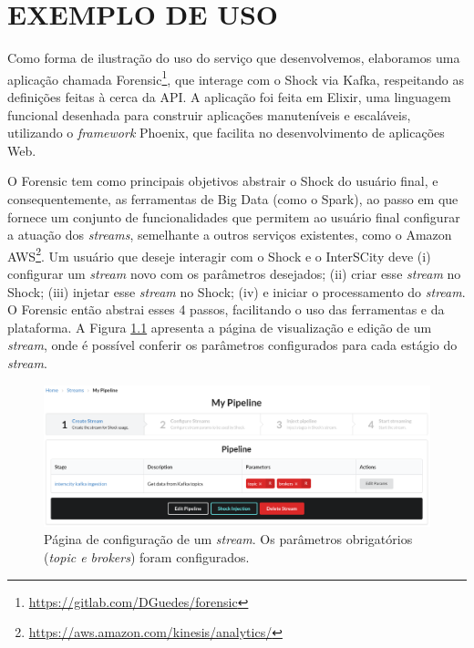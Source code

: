 \chapter[EXEMPLO DE USO]{EXEMPLO DE USO}
\label{chapter:example}

Como forma de ilustração do uso do serviço que desenvolvemos, elaboramos uma
aplicação chamada
Forensic\footnote{\url{https://gitlab.com/DGuedes/forensic}}, que interage
com o Shock via Kafka,
respeitando as definições feitas à cerca da API. A aplicação foi feita em
Elixir, uma linguagem funcional desenhada para construir aplicações
manuteníveis e escaláveis, utilizando o \textit{framework} Phoenix, que
facilita no desenvolvimento de aplicações Web.

O Forensic tem como principais objetivos abstrair o Shock do usuário final,
e consequentemente, as ferramentas de Big Data (como o Spark), ao passo em que
fornece um conjunto de funcionalidades que permitem ao usuário final configurar
a atuação dos \textit{streams}, semelhante a outros serviços existentes,
como o Amazon AWS\footnote{\url{https://aws.amazon.com/kinesis/analytics/}}.
Um usuário que deseje interagir com o Shock e o InterSCity deve
(i) configurar um \textit{stream} novo com os
parâmetros desejados; (ii) criar esse \textit{stream} no Shock; (iii) injetar
esse \textit{stream} no Shock; (iv) e iniciar o processamento do
\textit{stream}. O Forensic então abstrai esses 4 passos, facilitando o uso
das ferramentas e da plataforma. A Figura \ref{fig:forensicparams} apresenta
a página de visualização e edição de um \textit{stream}, onde é possível
conferir os parâmetros configurados para cada estágio do \textit{stream}.

\begin{figure}
  \centering
  \includegraphics[width=\textwidth]{figuras/pipeline.png}
    \caption{Página de configuração de um \textit{stream}. Os parâmetros
obrigatórios (\textit{topic e brokers}) foram configurados.}
  \label{fig:forensicparams}
\end{figure}


